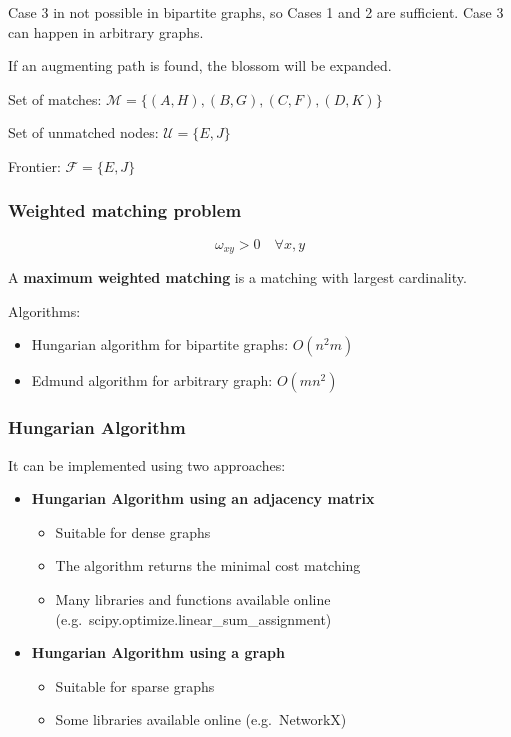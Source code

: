 \documentclass[10pt,a4paper]{article}
\begin{document}
Case 3 in not possible in bipartite graphs, so Cases 1 and 2 are sufficient. Case 3 can happen in arbitrary graphs.

If an augmenting path is found, the blossom will be expanded.
\newline

Set of matches: $\mathscr{M} = \{(A,H), (B,G), (C, F), (D,K) \}$

Set of unmatched nodes: $\mathscr{U} = \{ E, J \}$

Frontier: $\mathscr{F} = \{ E, J \}$

\subsubsection{Weighted matching problem}\label{weighted-matching-problem}

$$ \omega_{xy} > 0 \quad \forall x,y $$

A \textbf{maximum weighted matching} is a matching with largest cardinality.


Algorithms:

\begin{itemize}
\item Hungarian algorithm for bipartite graphs: $O(n^2 m)$
\item Edmund algorithm for arbitrary graph: $O(m n^2)$
\end{itemize}

\subsubsection{Hungarian Algorithm}\label{hungarian-algorithm}

It can be implemented using two approaches:

\begin{itemize}
\item \textbf{Hungarian Algorithm using an adjacency matrix}
\begin{itemize}
\item Suitable for dense graphs
\item The algorithm returns the minimal cost matching
\item Many libraries and functions available online\\
(e.g.~scipy.optimize.linear\_sum\_assignment)
\end{itemize}
\item \textbf{Hungarian Algorithm using a graph}
\begin{itemize}
\item Suitable for sparse graphs
\item Some libraries available online (e.g.~NetworkX)
\end{itemize}
\end{itemize}
\end{document}
